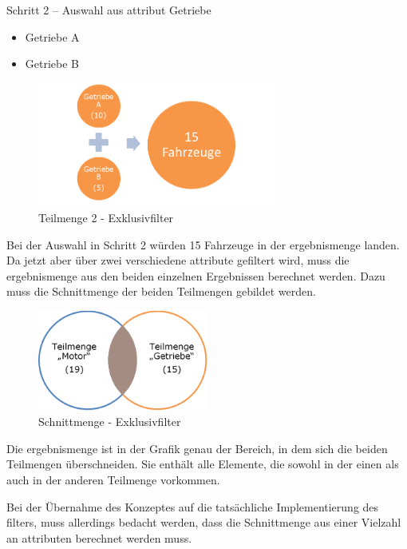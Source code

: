 Schritt 2 – Auswahl aus \gls{attribut} Getriebe
\begin{itemize}
	\item Getriebe A
	\item Getriebe B
\end{itemize}

\begin{figure}[H]
 \centering
 \includegraphics[width=0.7\textwidth]{grafiken/Filter_Getriebe.png}
 \caption{Teilmenge 2 - Exklusivfilter}
 \label{fig:filter3}
\end{figure}

Bei der Auswahl in Schritt 2 würden 15 Fahrzeuge in der \gls{ergebnismenge} landen. Da jetzt aber über zwei verschiedene \gls{attribut}e gefiltert wird, muss die \gls{ergebnismenge} aus den beiden einzelnen Ergebnissen berechnet werden. Dazu muss die Schnittmenge der beiden Teilmengen gebildet werden.

\begin{figure}[H]
 \centering
 \includegraphics[width=0.5\textwidth]{grafiken/Filter_Schnitt.png}
 \caption{Schnittmenge - Exklusivfilter}
 \label{fig:filter4}
\end{figure}

Die \gls{ergebnismenge} ist in der Grafik genau der Bereich, in dem sich die beiden Teilmengen überschneiden. Sie enthält alle Elemente, die sowohl in der einen als auch in der anderen Teilmenge vorkommen.

Bei der Übernahme des Konzeptes auf die tatsächliche Implementierung des \gls{filter}s, muss allerdings bedacht werden, dass die Schnittmenge aus einer Vielzahl an \gls{attribut}en berechnet werden muss.

